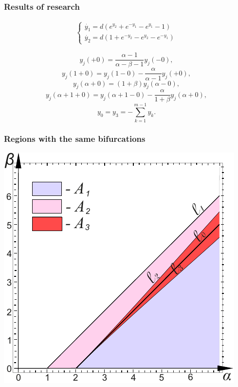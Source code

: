 \documentclass[fullscreen=true, unicode, bookmarks=false]{beamer}
\begin{document}
\begin{frame}
\frametitle{Results of research} 

$$
\begin{array}{l}
\begin{cases}
\dot{y_1} = d(e^{y_2} + e^{-y_1} - e^{y_1} - 1) \\
\dot{y_2} = d(1 + e^{-y_2} - e^{y_2} - e^{-y_1})
\end{cases}
\end{array}
$$

\medskip

$$ y_j(+0) = \frac{\alpha -1}{\alpha - \beta - 1}y_j(-0), $$
$$ y_j(1+0) = y_j(1-0) - \frac{\alpha}{\alpha - 1}y_j(+0), $$
$$ y_j(\alpha + 0) = (1 + \beta)y_j(\alpha - 0), $$
$$ y_j(\alpha + 1 + 0) = y_j(\alpha + 1 - 0) - \frac{\alpha}{1 + \beta}y_j(\alpha + 0), $$
$$ y_0 = y_3 = -\sum\limits_{k=1}^{m-1} y_k.  $$

\end{frame}

\begin{frame}
\frametitle{Regions with the same bifurcations} 
\begin{center}
  \includegraphics[scale=0.9]{Areas_periodic.pdf}  
 \end{center}
\end{frame}
\end{document}
